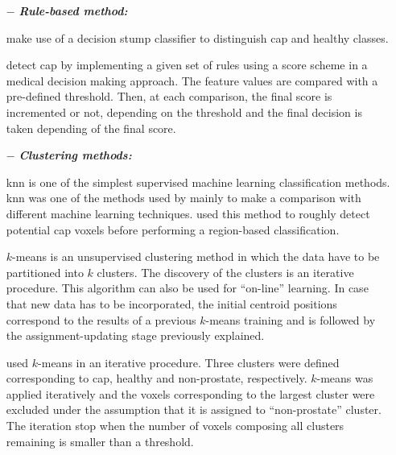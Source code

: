 \begin{enumerate}[leftmargin=*]

\item[$-$] \textbf{\textit{Rule-based method:}}

\cite{Lv2009} make use of a decision stump classifier to distinguish \ac{cap} and healthy classes. 

\cite{Puech2009} detect \ac{cap} by implementing a given set of rules using a score scheme in a medical decision making approach. The feature values are compared with a pre-defined threshold. Then, at each comparison, the final score is incremented or not, depending on the threshold and the final decision is taken depending of the final score.

\item[$-$] \textbf{\textit{Clustering methods:}} 

\acf{knn} is one of the simplest supervised machine learning classification methods. %
\ac{knn} was one of the methods used by \cite{Niaf2011,Niaf2012} mainly to make a comparison with different machine learning techniques. \cite{Litjens2012} used this method to roughly detect potential \ac{cap} voxels before performing a region-based classification.

$k$-means is an unsupervised clustering method in which the data have to be partitioned into $k$ clusters. The discovery of the clusters is an iterative procedure. %
This algorithm can also be used for ``on-line'' learning. In case that new data has to be incorporated, the initial centroid positions correspond to the results of a previous $k$-means training and is followed by the assignment-updating stage previously explained.

\cite{Tiwari2007,Tiwari2009} used $k$-means in an iterative procedure. Three clusters were defined corresponding to \ac{cap}, healthy and non-prostate, respectively. $k$-means was applied iteratively and the voxels corresponding to the largest cluster were excluded under the assumption that it is assigned to ``non-prostate'' cluster. The iteration stop when the number of voxels composing all clusters remaining is smaller than a threshold.


\end{enumerate}
